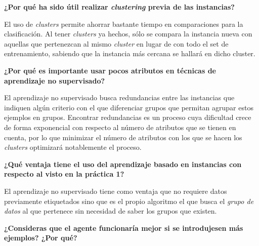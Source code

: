 \documentclass[12pt]{article}
\begin{document}
\newpage

\vspace{0.5cm}
\begin{center}
    \textbf{¿Por qué ha sido útil realizar \emph{clustering} previa de las instancias?}
\end{center}
\vspace{0.5cm}


El uso de \emph{clusters} permite ahorrar bastante tiempo en comparaciones para la clasificación. Al tener \emph{clusters} ya hechos, sólo se compara la instancia nueva con aquellas que pertenezcan al mismo \emph{cluster} en lugar de con todo el set de entrenamiento, sabiendo que la instancia más cercana se hallará en dicho cluster.

\vspace{0.5cm}
\begin{center}
    \textbf{¿Por qué es importante usar pocos atributos en técnicas de aprendizaje no supervisado?}
\end{center}
\vspace{0.5cm}

El aprendizaje no supervisado busca redundancias entre las instancias que indiquen algún criterio con el que diferenciar grupos que permitan agrupar estos ejemplos en grupos. Encontrar redundancias es un proceso cuya dificultad crece de forma exponencial con respecto al número de atributos que se tienen en cuenta, por lo que minimizar el número de atributos con los que se hacen los \emph{clusters} optimizará notablemente el proceso.

\vspace{0.5cm}
\begin{center}
    \textbf{¿Qué ventaja tiene el uso del aprendizaje basado en instancias con respecto al visto en la práctica 1?}
\end{center}
\vspace{0.5cm}

El aprendizaje no supervisado tiene como ventaja que no requiere datos previamente etiquetados sino que es el propio algoritmo el que busca el \emph{grupo de datos} al que pertenece sin necesidad de saber los grupos que existen.

\vspace{0.5cm}
\begin{center}
    \textbf{¿Consideras que el agente funcionaría mejor si se introdujesen más ejemplos? ¿Por qué?}
\end{center}
\vspace{0.5cm}
\end{document}
